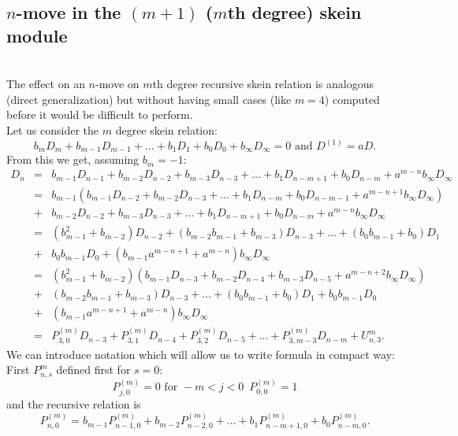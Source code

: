 \documentclass[12pt]{amsart}
\begin{document}
\subsection{\texorpdfstring{$n$-move in the $(m+1)$ ($m$th degree) skein module}{n2m1}}\label{nmovemdegree}\ \\
The effect on an $n$-move on $m$th degree recursive skein relation is analogous (direct generalization) but without having small cases (like $m=4$) computed before it would be difficult to perform.\\
Let us consider the $m$ degree skein relation:
\begin{equation*}
b_mD_m+b_{m-1}D_{m-1}+ \ldots + b_1D_1 +b_0D_0+ b_\infty D_\infty =0 \mbox{ and } D^{(1)}=aD.    
\end{equation*}
From this we get, assuming $b_m = -1$:
\begin{eqnarray*}
D_n&=&b_{m-1}D_{n-1} + b_{m-2}D_{n-2}+ b_{m-3}D_{n-3}+\ldots + b_{1} D_{n-m+1}+ b_0D_{n-m}+ a^{m-n}b_{\infty}D_{\infty}\\
&=& b_{m-1}(b_{m-1}D_{n-2} + b_{m-2}D_{n-3}+ \ldots + b_{1} D_{n-m}+ b_0D_{n-m-1}+ a^{m-n+1}b_{\infty}D_{\infty})\\
&+&b_{m-2}D_{n-2}+  b_{m-3}D_{n-3}+\ldots + b_1 D_{n-m+1}+ b_0D_{n-m}+ a^{m-n}b_{\infty}D_{\infty}\\
&=&(b_{m-1}^2+b_{m-2})D_{n-2}+ (b_{m-2}b_{m-1}+ b_{m-3})D_{n-3}+ \ldots +(b_0b_{m-1}+b_0)D_1\\
&+& b_0b_{m-1}D_0 + (b_{m-1}a^{m-n+1}+ a^{m-n})b_{\infty}D_{\infty}\\
&=&(b_{m-1}^2+b_{m-2})(b_{m-1}D_{n-3}+b_{m-2}D_{n-4}+b_{m-3}D_{n-5}+a^{m-n+2}b_\infty D_\infty)\\
&+& (b_{m-2}b_{m-1}+ b_{m-3})D_{n-3}+ \ldots +(b_0b_{m-1}+b_0)D_1 + b_0b_{m-1}D_0\\
&+&(b_{m-1}a^{m-n+1}+ a^{m-n})b_{\infty}D_{\infty}\\
&=&P_{3,0}^{(m)}D_{n-3}+ P_{3,1}^{(m)} D_{n-4}+ P_{3,2}^{(m)}D_{n-5}+\ldots+ P_{3,m-3}^{(m)}D_{n-m}+U_{n,3}^m. 
\end{eqnarray*}
We can introduce notation which will allow us to write formula in compact way: First $P_{n,s}^{m}$ defined first for $s=0$:
\begin{equation*}
P^{(m)}_{j,0}=0\,\,\text{for}\,\,-m <j <0\,\,\,P^{(m)}_{0,0}=1
\end{equation*}
and the recursive relation is 
$$P_{n,0}^{(m)} = b_{m-1}P_{n-1,0}^{(m)}+b_{m-2}P_{n-2,0}^{(m)}+...+b_{1}P_{n-m+1,0}^{(m)}+b_0P_{n-m,0}^{(m)}.$$
\end{document}
